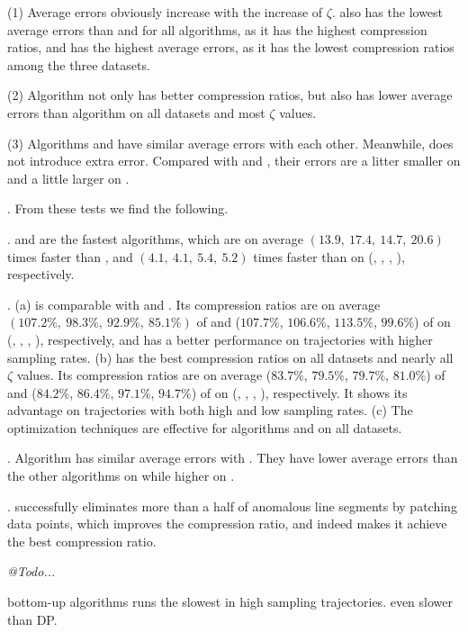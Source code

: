 \sstab(1) Average errors obviously increase with the increase of $\zeta$. \taxi also has the lowest average errors than \truck and \sercar for all algorithms,
as it has the highest compression ratios, and \sercar has the highest average errors, as it has the lowest compression ratios among the three datasets.

\sstab(2) Algorithm \dpa not only has better compression ratios, but also has lower average errors than algorithm \fbqsa on all datasets and most $\zeta$ values.

\sstab(3) Algorithms \operb and \operba have similar average errors with each other. Meanwhile, \operba does not introduce extra error. Compared with \dpa and \fbqsa, their errors are a litter smaller on \taxi and a little larger on \sercar.







.
From these tests we find the following.


\emph{}. \operb and \operba are the fastest algorithms, which are on average $(13.9, ~17.4, ~14.7, {~20.6})$ times faster than \dpa, and $(4.1,~4.1,~5.4, {~5.2})$
times faster than \fbqsa on (\taxi, \truck, \sercar, \geolife), respectively.

\emph{}. (a) \operb is comparable {with \fbqsa and \dpa}. Its compression ratios are on average $(107.2\%, ~98.3\%, ~92.9\%, ~85.1\%)$ of \fbqsa and ($107.7\%$, $106.6\%$, $113.5\%$, $99.6\%$) of \dpa on (\taxi, \truck, \sercar, \geolife), respectively, and \operb has a better performance on trajectories with higher sampling rates.
(b) \operba has the best compression ratios on all datasets and nearly all $\zeta$ values.
Its compression ratios are on average {($83.7\%$, $79.5\%$, $79.7\%$, $81.0\%$)} of \fbqsa and {($84.2\%$, $86.4\%$, $97.1\%$, $94.7\%$)} of \dpa on (\taxi, \truck, \sercar, \geolife), respectively.
It shows its advantage on trajectories with both high and low sampling rates.
(c) The optimization techniques are effective for algorithms \operb and \operba on all datasets.

\emph{}. {Algorithm \operb has similar average errors with \operba. They have lower average errors than the other algorithms on \taxi while higher on \sercar.}

\emph{}. \operba  successfully eliminates more than a half of anomalous line segments by patching data points,
which improves the compression ratio, and indeed makes it achieve the best compression ratio.


\em
@Todo...

bottom-up algorithms runs the slowest in high sampling trajectories. even slower than DP.

\em




